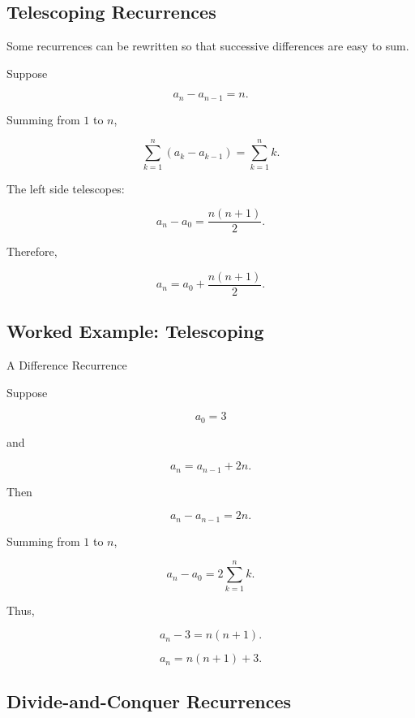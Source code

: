 \subsection{Telescoping Recurrences}
\label{subsec:telescoping-recurrences}

Some recurrences can be rewritten so that successive differences are
easy to sum.

Suppose

\[
a_n-a_{n-1}=n.
\]

Summing from \(1\) to \(n\),

\[
\sum_{k=1}^{n}(a_k-a_{k-1})
=
\sum_{k=1}^{n}k.
\]

The left side telescopes:

\[
a_n-a_0
=
\frac{n(n+1)}{2}.
\]

Therefore,

\[
\boxed{
a_n
=
a_0+\frac{n(n+1)}{2}.
}
\]

\subsection{Worked Example: Telescoping}
\label{subsec:worked-telescoping}

\begin{workedexamplebox}{A Difference Recurrence}

Suppose

\[
a_0=3
\]

and

\[
a_n=a_{n-1}+2n.
\]

Then

\[
a_n-a_{n-1}=2n.
\]

Summing from \(1\) to \(n\),

\[
a_n-a_0
=
2\sum_{k=1}^{n}k.
\]

Thus,

\[
a_n-3
=
n(n+1).
\]

\begin{answerbox}
\[
\boxed{
a_n=n(n+1)+3.
}
\]
\end{answerbox}

\end{workedexamplebox}

\subsection{Divide-and-Conquer Recurrences}
\label{subsec:divide-and-conquer-recurrences}

